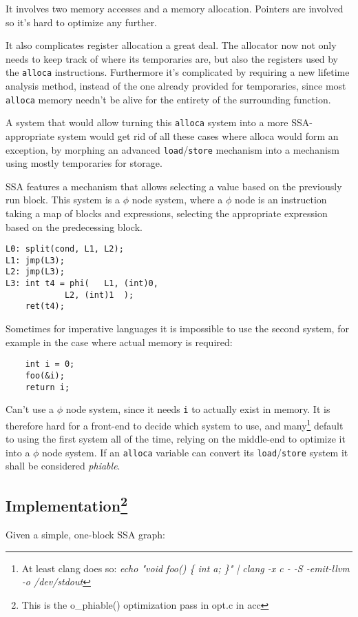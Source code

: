 \documentclass[12pt, a4paper]{article}
\begin{document}
It involves two memory accesses and a memory allocation. Pointers are involved
so it's hard to optimize any further.

It also complicates register allocation a great deal. The allocator now not 
only needs to keep track of where its temporaries are, but also the registers 
used by the \verb+alloca+ instructions. Furthermore it's complicated by 
requiring a new lifetime analysis method, instead of the one already provided 
for temporaries, since most \verb+alloca+ memory needn't be alive for the 
entirety of the surrounding function.

A system that would allow turning this \verb+alloca+ system into a more
SSA-appropriate  system would get rid of all these cases where alloca would form
an exception, by morphing an advanced \verb+load+/\verb+store+ mechanism into a
mechanism using mostly temporaries for storage.

SSA features a mechanism that allows selecting a value based on the previously 
run block. This system is a $\phi$ node system, where a $\phi$ node is an
instruction taking a map of blocks and expressions, selecting the appropriate
expression based on the predecessing block.

\begin{lstlisting}
L0:	split(cond, L1, L2);
L1:	jmp(L3);
L2:	jmp(L3);
L3:	int t4 = phi(	L1, (int)0,
			L2, (int)1	);
	ret(t4);
\end{lstlisting}

Sometimes for imperative languages it is impossible to use the second system, 
for example in the case where actual memory is required:

\begin{lstlisting}
	int i = 0;
	foo(&i);
	return i;
\end{lstlisting}

Can't use a $\phi$ node system, since it needs \verb+i+ to actually exist in 
memory. It is therefore hard for a front-end to decide which system to use, and 
many\footnote{At least clang does so: \textit{echo "void foo() \{ int a; \}" |
 clang -x c - -S -emit-llvm -o /dev/stdout}}
default to using the first system all of the time, relying on the 
middle-end to optimize it into a $\phi$ node system. If an \verb+alloca+ 
variable can convert its \verb+load+/\verb+store+ system it shall be considered 
\textit{phiable}.

\subsection[Implementation] {Implementation\footnote{This is the o\_phiable() optimization pass in opt.c in acc} }
Given a simple, one-block SSA graph:
\end{document}
